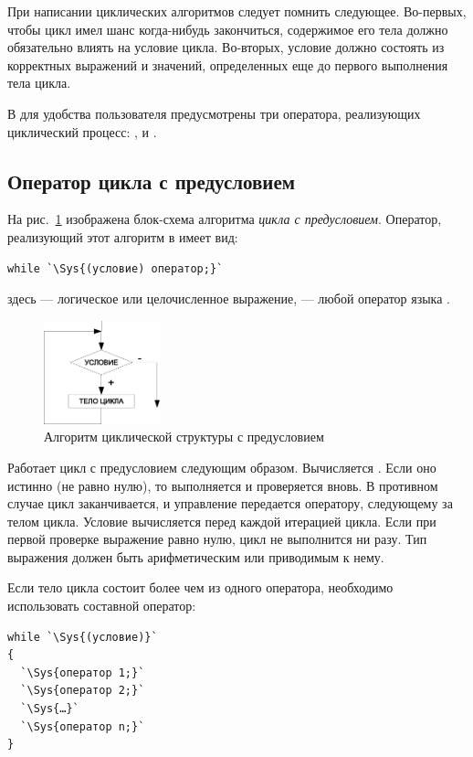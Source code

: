 При написании циклических алгоритмов следует помнить следующее. Во-первых, чтобы цикл имел шанс когда-нибудь
закончиться, содержимое его тела должно обязательно влиять на условие цикла. Во-вторых, условие должно состоять из
корректных выражений и значений, определенных еще до первого выполнения тела цикла. 

В  для удобства пользователя предусмотрены три оператора, реализующих циклический процесс: ,
 и .

\subsection[Оператор цикла с предусловием]{Оператор цикла с предусловием}
На рис.~\ref{ch03:refDrawing21} изображена блок-схема алгоритма \emph{цикла с предусловием}. Оператор, реализующий этот алгоритм в  имеет вид:
\begin{lstlisting}
while `\Sys{(условие) оператор;}`
\end{lstlisting}
здесь  --- логическое или целочисленное выражение,  --- любой оператор языка .

\begin{figure}[htb]
\begin{center}
\includegraphics[width=0.3\textwidth]{img/ris_3_22}
\caption{Алгоритм циклической структуры с предусловием}
\label{ch03:refDrawing21}
\end{center}
\end{figure}

Работает цикл с предусловием следующим образом. Вычисляется . Если оно истинно (не равно
нулю), то выполняется  и  проверяется вновь. В противном случае цикл заканчивается, и управление передается
оператору, следующему за телом цикла. Условие вычисляется перед каждой итерацией цикла. Если при первой проверке
выражение равно нулю, цикл не выполнится ни разу. Тип выражения должен быть арифметическим или приводимым к нему. 

Если тело цикла состоит более чем из одного оператора, необходимо использовать составной оператор:
\begin{lstlisting}
while `\Sys{(условие)}`
{
  `\Sys{оператор 1;}`
  `\Sys{оператор 2;}`
  `\Sys{…}`
  `\Sys{оператор n;}`
}
\end{lstlisting}

